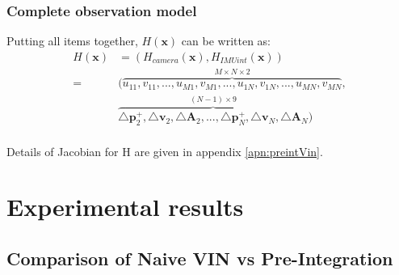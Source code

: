 \documentclass[12pt]{article}   %
\begin{document}
\subsubsection{Complete observation model}
Putting all items together, $H(\textbf{x})$ can be written as:
\begin{align} %
H(\textbf{x}) &= (H_{camera}(\textbf{x}), H_{IMUint}(\textbf{x})) \nonumber \\
=& (\overbrace{{u}_{11}, {v}_{11}, ... , {u}_{M1}, {v}_{M1}, ..., {u}_{1N}, {v}_{1N}, ... , {u}_{MN}, {v}_{MN}}^{M \times N \times 2}, \nonumber \nonumber \\ 
& \overbrace{\triangle \textbf{p}^+_{2}, \triangle \textbf{v}_{2}, \triangle \textbf{A}_{2}, ... , \triangle \textbf{p}^+_{N}, \triangle \textbf{v}_{N}, \triangle \textbf{A}_{N}}^{(N-1) \times 9}) 
\end{align}\\
Details of Jacobian for H are given in appendix \ref{apn:preintVin}.

\section{Experimental results}
\subsection{Comparison of Naive VIN vs Pre-Integration}
\end{document}
